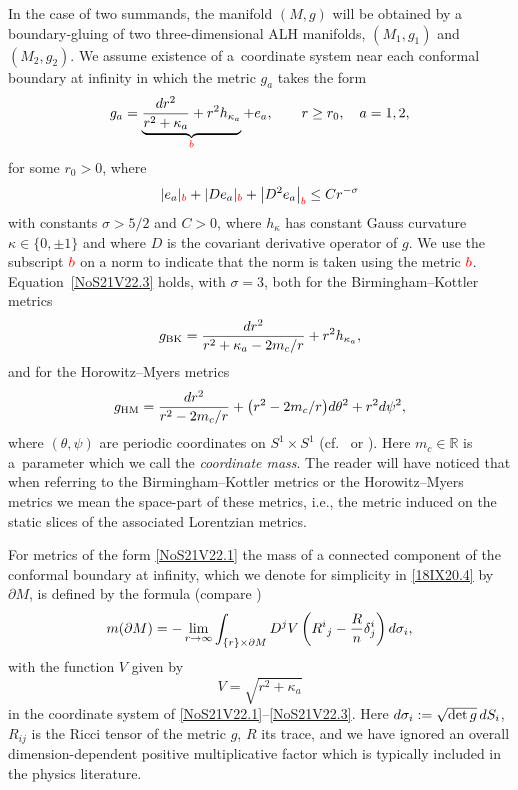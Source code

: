 \documentclass[10pt,a4paper]{article}
\numberwithin{equation}{section}
\newcommand{\mygb}{\red{b}}
\newcommand{\R}{\mathbb R}
\newcommand{\red}[1]{{\color{red}#1}}
\begin{document}
In the case of two summands, the manifold $(M,g)$ will be obtained by a boundary-gluing of two three-dimensional ALH manifolds, $(M_1,g_1)$ and $(M_2,g_2)$. We assume existence of a~coordinate system near each conformal boundary at infinity in which the metric $g_a$ takes the form
\begin{gather}\label{NoS21V22.1}
 g_a = \underbrace{
 \frac{{\rm d}r^2}{r^2+\kappa_a} + r^2 h_{\kappa_a}
 }_{\mygb} + e_a ,
 \qquad
 r\ge r_0, \quad
 a=1,2,
\end{gather}
for some $r_0>0$, where
\begin{equation}\label{NoS21V22.3}
 |e_a|_{\mygb}
 + |D e_a|_{\mygb}
 + \big|D^2 e_a\big|_{\mygb}
 \le C r^{-\sigma}
\end{equation}
with constants $\sigma>5/2$ and $C>0$, where $h_\kappa$ has constant Gauss curvature $\kappa \in \{0,\pm1\}$
and where $D$ is the covariant derivative operator of $g$.
We use the subscript $\mygb$ on a norm to indicate that the norm is taken using the metric $\mygb$.
Equation~\eqref{NoS21V22.3} holds, with $\sigma = 3$, both for the Birmingham--Kottler metrics
\begin{equation}\label{21XI22.p1}
 g_{\text{BK}} = \frac{{\rm d}r^2}{r^2+\kappa_a - 2m_c/r} + r^2 h_{\kappa_a},
\end{equation}
and for the Horowitz--Myers metrics
\begin{equation}\label{21XI22.p2}
 g_{\text{HM}}
 = \frac{{\rm d}r^2}{r^2 - 2m_c/r} + \big(r^2 - 2m_c/r\big) {\rm d}\theta^2 + r^2 {\rm d}\psi^2,
\end{equation}
%
where $(\theta,\psi)$ are periodic coordinates on $S^1\times S^1$ (cf.~\cite{Birmingham,HorowitzMyers,Kottler} or \cite{ChruscielBHBook}). Here $m_c\in \R$ is a~parameter which we call the \emph{coordinate mass}.
The reader will have noticed that when referring to the Birmingham--Kottler metrics or the Horowitz--Myers metrics we mean the space-part of these metrics, i.e., the metric induced on the static slices of the associated Lorentzian metrics.

For metrics of the form \eqref{NoS21V22.1} the mass of a connected component of the conformal boundary at infinity, which we denote for simplicity in \eqref{18IX20.4} by $\partial M$, is defined
 by the formula
 \cite{HerzlichRicciMass} (compare \cite[equation~(IV.40)]{BCHKK})
 \begin{gather}
 m( \partial M)
 =
 - \lim_{r\rightarrow \infty}\int_{\{r\} \times \partial M} D^j V
 \left( R{}^i{}_j - \frac {R{}}{n}\delta^i_j\right) {\rm d}\sigma_i,
 \label{18IX20.4}
 \end{gather}
 with the function $V$ given by
 \begin{equation}\label{1XI22.11}
 V =\sqrt{r^2 + \kappa_a}
 \end{equation}
 in the coordinate system of \eqref{NoS21V22.1}--\eqref{NoS21V22.3}.
 Here
 ${\rm d}\sigma_i := \sqrt{\det g} \,{\rm d}S_i$,
 $R_{ij}$ is the Ricci tensor of the metric $g$, $R$ its trace, and
 we have ignored an overall dimension-dependent positive multiplicative factor which is typically included in the physics literature.
\end{document}
